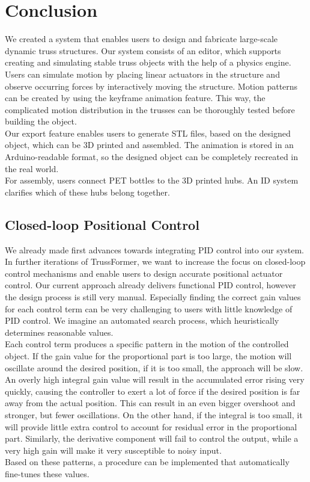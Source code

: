 \chapter{Conclusion}\label{ch:conclusion}
We created a system that enables users to design and fabricate large-scale dynamic truss structures. Our system consists of an editor, which supports creating and simulating stable truss objects with the help of a physics engine. Users can simulate motion by placing linear actuators in the structure and observe occurring forces by interactively moving the structure. Motion patterns can be created by using the keyframe animation feature. This way, the complicated motion distribution in the trusses can be thoroughly tested before building the object.\\
Our export feature enables users to generate STL files, based on the designed object, which can be 3D printed and assembled. The animation is stored in an Arduino-readable format, so the designed object can be completely recreated in the real world.\\
For assembly, users connect PET bottles to the 3D printed hubs. An ID system clarifies which of these hubs belong together.

\section{Closed-loop Positional Control}
We already made first advances towards integrating PID control into our system. In further iterations of TrussFormer, we want to increase the focus on closed-loop control mechanisms and enable users to design accurate positional actuator control. Our current approach already delivers functional PID control, however the design process is still very manual. Especially finding the correct gain values for each control term can be very challenging to users with little knowledge of PID control. We imagine an automated search process, which heuristically determines reasonable values.\\
Each control term produces a specific pattern in the motion of the controlled object. If the gain value for the proportional part is too large, the motion will oscillate around the desired position, if it is too small, the approach will be slow. An overly high integral gain value will result in the accumulated error rising very quickly, causing the controller to exert a lot of force if the desired position is far away from the actual position. This can result in an even bigger overshoot and stronger, but fewer oscillations. On the other hand, if the integral is too small, it will provide little extra control to account for residual error in the proportional part. Similarly, the derivative component will fail to control the output, while a very high gain will make it very susceptible to noisy input.\\
Based on these patterns, a procedure can be implemented that automatically fine-tunes these values.

